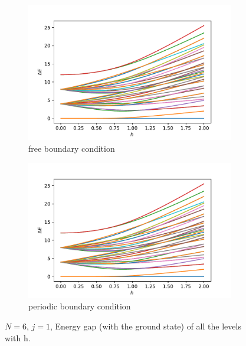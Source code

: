 \documentclass[a4paper]{extarticle}
\begin{document}
\begin{figure}[h!]
  \begin{subfigure}[h]{0.95\textwidth}
        \includegraphics[height=.73\linewidth]{../plots/pl_is_all_fbc}
        \caption{free boundary condition}
        \label{fig:fbc}
    \end{subfigure}
  \begin{subfigure}[h]{0.95\textwidth}
        \includegraphics[height=.73\linewidth]{../plots/pl_is_all}
        \caption{periodic boundary condition}
        \label{fig:pbc}
    \end{subfigure}
    \caption[Energy gap (with the ground state) of all the levels with h.]{$N=6$, $j=1$, Energy gap (with the ground state) of all the levels with h.}
    \label{fig:Egvsh}
\end{figure}
\end{document}

